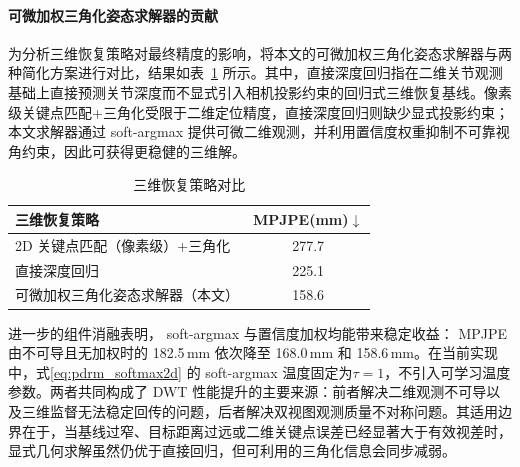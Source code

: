 \paragraph{可微加权三角化姿态求解器的贡献}
为分析三维恢复策略对最终精度的影响，将本文的可微加权三角化姿态求解器与两种简化方案进行对比，结果如表~\ref{tab:ablation_solver} 所示。其中，直接深度回归指在二维关节观测基础上直接预测关节深度而不显式引入相机投影约束的回归式三维恢复基线。像素级关键点匹配+三角化受限于二维定位精度，直接深度回归则缺少显式投影约束；本文求解器通过 soft-argmax 提供可微二维观测，并利用置信度权重抑制不可靠视角约束，因此可获得更稳健的三维解。
\begin{table}[htbp]
  \centering
  \small
\caption{三维恢复策略对比}
  \label{tab:ablation_solver}
  \begin{tabular}{lc}
    \toprule
    三维恢复策略 & MPJPE(mm)$\downarrow$ \\
    \midrule
    2D 关键点匹配（像素级）+三角化 & 277.7 \\
    直接深度回归 & 225.1 \\
    可微加权三角化姿态求解器（本文） & 158.6 \\
    \bottomrule
  \end{tabular}
\end{table}

进一步的组件消融表明， soft-argmax 与置信度加权均能带来稳定收益： MPJPE 由不可导且无加权时的 182.5\,mm 依次降至 168.0\,mm 和 158.6\,mm。在当前实现中，式\eqref{eq:pdrm_softmax2d} 的 soft-argmax 温度固定为$\tau=1$，不引入可学习温度参数。两者共同构成了 DWT 性能提升的主要来源：前者解决二维观测不可导以及三维监督无法稳定回传的问题，后者解决双视图观测质量不对称问题。其适用边界在于，当基线过窄、目标距离过远或二维关键点误差已经显著大于有效视差时，显式几何求解虽然仍优于直接回归，但可利用的三角化信息会同步减弱。

